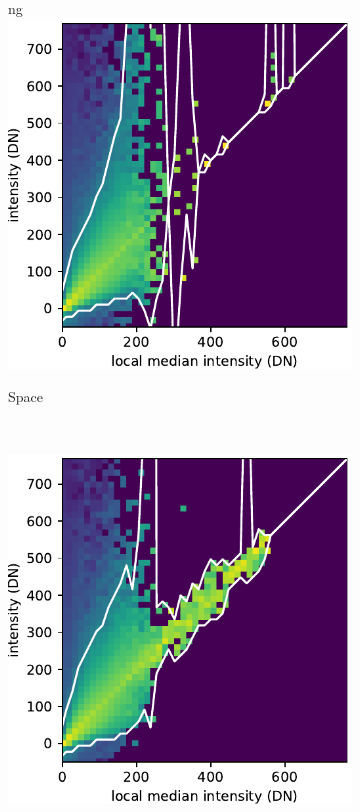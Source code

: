 \documentclass[10pt,letterpaper, doublespace]{article}
\begin{document}
\begin{figure}[t!]
\begin{subfigure}[t]{0.288\textwidth}
ng
					\includegraphics[width=\textwidth]{fig/hist_1}
					\caption{Space}
				\end{subfigure}
				~ 
				\begin{subfigure}[t]{0.288\textwidth}
					\centering
					\includegraphics[width=\textwidth]{fig/hist_2}

\end{subfigure}
\end{figure}
\end{document}
